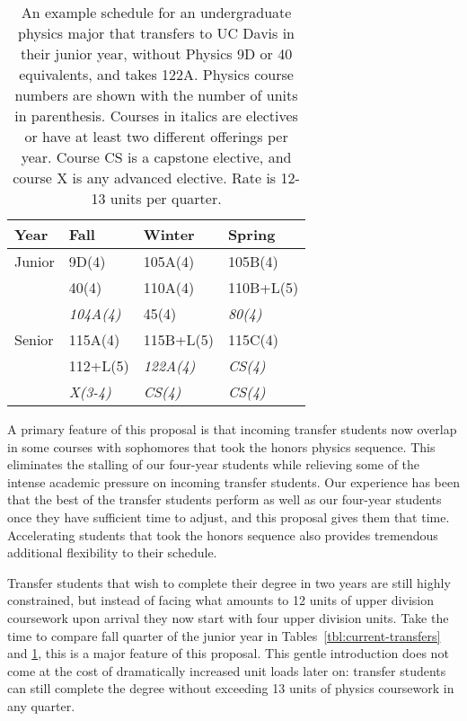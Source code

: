 \documentclass[12pt]{article}
\begin{document}
\begin{table}

\caption{An example schedule for an undergraduate physics major that 
transfers to UC Davis in their junior year, without Physics 9D or 40 equivalents, and takes 122A. Physics course numbers are shown with the number of units in parenthesis.  Courses in italics are electives or have at least two different offerings per year. Course CS is a capstone elective, and course X is any advanced elective.
Rate is 12-13 units per quarter.}
\label{tbl:proposed-transfers}
\begin{center}
\begin{tabular}{|l|l|l|l|}
\hline
Year      & Fall    & Winter & Spring \\
\hline
Junior   & 9D(4)         & 105A(4)   & 105B(4) \\
         & 40(4)         & 110A(4)   & 110B+L(5) \\         
         & {\it 104A(4)} & 45(4)     & {\it 80(4)} \\
\hline
Senior   & 115A(4)    & 115B+L(5)      & 115C(4) \\
         & 112+L(5)   & {\it 122A(4)} & {\it CS(4)} \\
         & {\it X(3-4)} & {\it CS(4)}   & {\it CS(4)}  \\
\hline 
\end{tabular}
\end{center}
\end{table}

A primary feature of this proposal is that incoming transfer students now overlap in some courses with sophomores that took the honors physics sequence.  This eliminates the stalling of our four-year students while relieving some of the intense academic pressure on incoming transfer students.  Our experience has been that the best of the transfer students perform as well as our four-year students once they have sufficient time to adjust, and this proposal gives them that time.  Accelerating students that took the honors sequence also provides tremendous additional flexibility to their schedule.  

Transfer students that wish to complete their degree in two years are still highly constrained, but instead of facing what amounts to 12 units of upper division coursework upon arrival they now start with four upper division units.  Take the time to compare fall quarter of the junior year in Tables~\ref{tbl:current-transfers} and \ref{tbl:proposed-transfers}, this is a major feature of this proposal.  This gentle introduction does not come at the cost of dramatically increased unit loads later on: transfer students can still complete the degree without exceeding 13 units of physics coursework in any quarter.  
\end{document}
